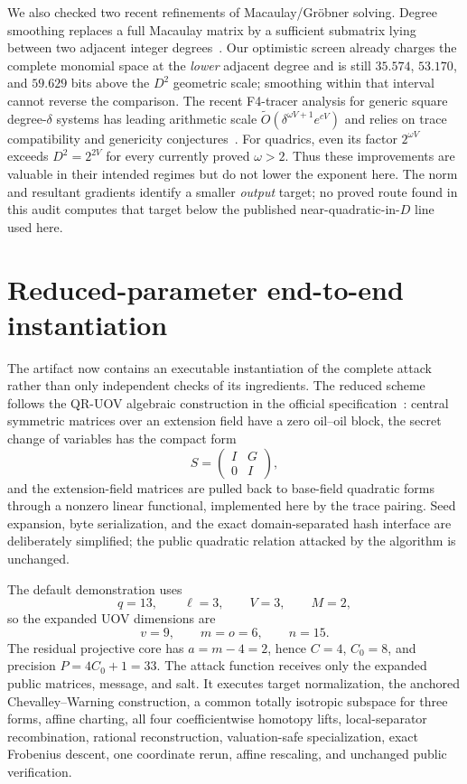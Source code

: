 \documentclass[11pt,a4paper]{article}
\theoremstyle{definition}
\theoremstyle{remark}
\begin{document}
We also checked two recent refinements of Macaulay/Gr\"obner solving.  Degree smoothing replaces a full Macaulay matrix by a sufficient submatrix lying between two adjacent integer degrees~\cite{DegreeSmoothing}.  Our optimistic screen already charges the complete monomial space at the \emph{lower} adjacent degree and is still $35.574$, $53.170$, and $59.629$ bits above the $D^2$ geometric scale; smoothing within that interval cannot reverse the comparison.  The recent F4-tracer analysis for generic square degree-$\delta$ systems has leading arithmetic scale $\widetilde O(\delta^{\omega V+1}e^{cV})$ and relies on trace compatibility and genericity conjectures~\cite{F4Tracer}.  For quadrics, even its factor $2^{\omega V}$ exceeds $D^2=2^{2V}$ for every currently proved $\omega>2$.  Thus these improvements are valuable in their intended regimes but do not lower the exponent here.  The norm and resultant gradients identify a smaller \emph{output} target; no proved route found in this audit computes that target below the published near-quadratic-in-$D$ line used here.

\section{Reduced-parameter end-to-end instantiation}\label{app:reduced-implementation}

The artifact now contains an executable instantiation of the complete attack rather than only independent checks of its ingredients.  The reduced scheme follows the QR-UOV algebraic construction in the official specification~\cite{QRUOVSpec}: central symmetric matrices over an extension field have a zero oil--oil block, the secret change of variables has the compact form
\[
 S=\begin{pmatrix}I&G\\0&I\end{pmatrix},
\]
and the extension-field matrices are pulled back to base-field quadratic forms through a nonzero linear functional, implemented here by the trace pairing.  Seed expansion, byte serialization, and the exact domain-separated hash interface are deliberately simplified; the public quadratic relation attacked by the algorithm is unchanged.

The default demonstration uses
\[
 q=13,\qquad \ell=3,\qquad V=3,\qquad M=2,
\]
so the expanded UOV dimensions are
\[
 v=9,\qquad m=o=6,\qquad n=15.
\]
The residual projective core has $a=m-4=2$, hence $C=4$, $C_0=8$, and precision $P=4C_0+1=33$.  The attack function receives only the expanded public matrices, message, and salt.  It executes target normalization, the anchored Chevalley--Warning construction, a common totally isotropic subspace for three forms, affine charting, all four coefficientwise homotopy lifts, local-separator recombination, rational reconstruction, valuation-safe specialization, exact Frobenius descent, one coordinate rerun, affine rescaling, and unchanged public verification.
\end{document}
